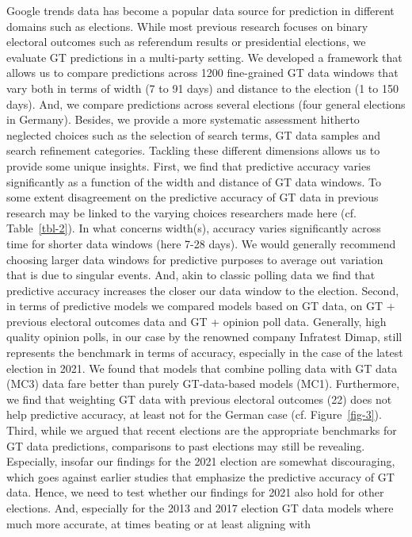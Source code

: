 \documentclass[
  letterpaper,
  DIV=11,
  numbers=noendperiod]{scrartcl}
\begin{document}
Google trends data has become a popular data source for prediction in
different domains such as elections. While most previous research
focuses on binary electoral outcomes such as referendum results or
presidential elections, we evaluate GT predictions in a multi-party
setting. We developed a framework that allows us to compare predictions
across 1200 fine-grained GT data windows that vary both in terms of
width (7 to 91 days) and distance to the election (1 to 150 days). And,
we compare predictions across several elections (four general elections
in Germany). Besides, we provide a more systematic assessment hitherto
neglected choices such as the selection of search terms, GT data samples
and search refinement categories. Tackling these different dimensions
allows us to provide some unique insights. First, we find that
predictive accuracy varies significantly as a function of the width and
distance of GT data windows. To some extent disagreement on the
predictive accuracy of GT data in previous research may be linked to the
varying choices researchers made here (cf. Table~\ref{tbl-2}). In what
concerns width(s), accuracy varies significantly across time for shorter
data windows (here 7-28 days). We would generally recommend choosing
larger data windows for predictive purposes to average out variation
that is due to singular events. And, akin to classic polling data we
find that predictive accuracy increases the closer our data window to
the election. Second, in terms of predictive models we compared models
based on GT data, on GT + previous electoral outcomes data and GT +
opinion poll data. Generally, high quality opinion polls, in our case by
the renowned company Infratest Dimap, still represents the benchmark in
terms of accuracy, especially in the case of the latest election in
2021. We found that models that combine polling data with GT data (MC3)
data fare better than purely GT-data-based models (MC1). Furthermore, we
find that weighting GT data with previous electoral outcomes (22) does
not help predictive accuracy, at least not for the German case (cf.
Figure~\ref{fig-3}). Third, while we argued that recent elections are
the appropriate benchmarks for GT data predictions, comparisons to past
elections may still be revealing. Especially, insofar our findings for
the 2021 election are somewhat discouraging, which goes against earlier
studies that emphasize the predictive accuracy of GT data. Hence, we
need to test whether our findings for 2021 also hold for other
elections. And, especially for the 2013 and 2017 election GT data models
where much more accurate, at times beating or at least aligning with
\end{document}
